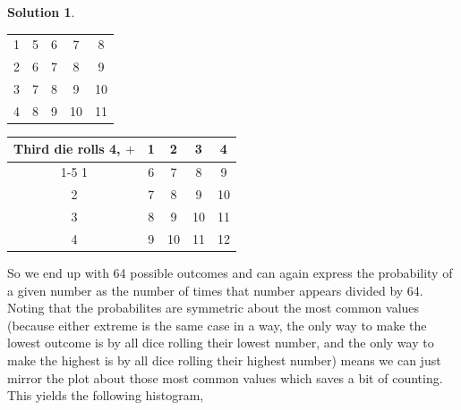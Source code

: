 \documentclass[10pt]{article}
\theoremstyle{definition}
\newtheorem{soln}{Solution}
\begin{document}
\begin{soln}
\begin{enumerate}[label=(\alph*)]
\begin{center}
\begin{tabular}{c | c c c c}
              1                      & 5 & 6 & 7  & 8  \\
              2                      & 6 & 7 & 8  & 9  \\
              3                      & 7 & 8 & 9  & 10 \\
              4                      & 8 & 9 & 10 & 11 \\
            \end{tabular}
            \begin{tabular}{c | c c c c}
              Third die rolls 4, $+$ & 1 & 2  & 3  & 4  \\
              \cline{1-5}
              1                      & 6 & 7  & 8  & 9  \\
              2                      & 7 & 8  & 9  & 10 \\
              3                      & 8 & 9  & 10 & 11 \\
              4                      & 9 & 10 & 11 & 12 \\
            \end{tabular}
          \end{center}
          So we end up with 64 possible outcomes and can again express the probability of a given number as the number of times that number appears divided by 64.
          Noting that the probabilites are symmetric about the most common values (because either extreme is the same case in a way, the only way to make 
          the lowest outcome is by all dice rolling their lowest number, and the only way to make the highest is by all dice rolling their highest number) means
          we can just mirror the plot about those most common values which saves a bit of counting. This yields the following histogram,
          \begin{center}
          \end{center}
  \end{enumerate}
\end{soln}
\end{document}
